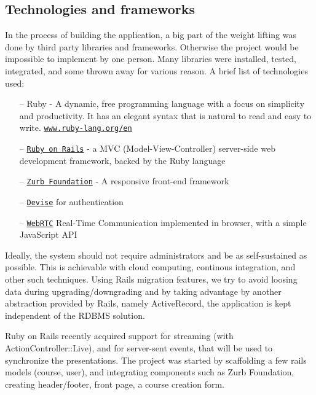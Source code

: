 \subsection{Technologies and frameworks}
In the process of building the application, a big part of the weight lifting was done by third
party libraries and frameworks. Otherwise the project would be impossible to implement by
one person. Many libraries were installed, tested, integrated, and some thrown away for
various reason.
A brief list of technologies used:
\begin{enumerate}[topsep=5pt, partopsep=0pt,itemsep=3pt,parsep=1pt]
    \item[--] Ruby - A dynamic, free programming language with a focus on
        simplicity and productivity.
        It has an elegant syntax that is natural to read and easy to write.
        \href{https://wwww.ruby-lang.org/en/}{\texttt{www.ruby-lang.org/en}}
    \item[--] \href{http://rubyonrails.org}{\texttt{Ruby on Rails}} - a MVC
        (Model-View-Controller) server-side web development framework, backed by
        the Ruby language
    \item[--] \href{http://foundation.zurb.com/}{\texttt{Zurb Foundation}} - A
        responsive front-end framework
    \item[--] \href{https://github.com/plataformatec/devise}{\texttt{Devise}} for
        authentication
    \item[--] \href{http://www.webrtc.org/}{\texttt{WebRTC}} Real-Time Communication
        implemented in browser, with a simple JavaScript API
\end{enumerate}

Ideally, the system should not require administrators and be as self-sustained as possible.
This is achievable with cloud computing, continous integration, and other such techniques.
Using Rails migration features, we try to avoid loosing data during upgrading/downgrading and
by taking advantage by another abstraction provided by Rails, namely ActiveRecord, the application
is kept independent of the RDBMS solution.

Ruby on Rails recently acquired support for streaming (with ActionController::Live),
and for server-sent events, that will be used to synchronize the presentations.
The project was started by scaffolding a few rails models (course, user), and
integrating components such as Zurb Foundation, creating header/footer, front
page, a course creation form.

